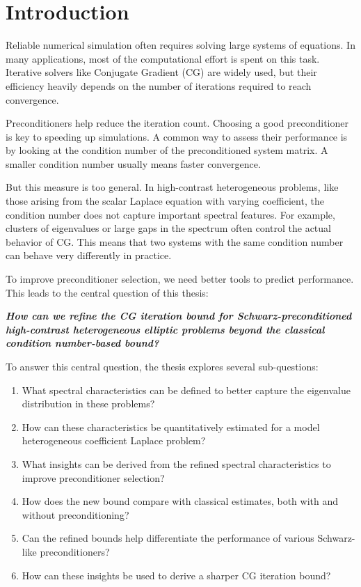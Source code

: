 \chapter{Introduction}\label{ch:introduction}
Reliable numerical simulation often requires solving large systems of equations. In many applications, most of the computational effort is spent on this task. Iterative solvers like Conjugate Gradient (CG) are widely used, but their efficiency heavily depends on the number of iterations required to reach convergence.

Preconditioners help reduce the iteration count. Choosing a good preconditioner is key to speeding up simulations. A common way to assess their performance is by looking at the condition number of the preconditioned system matrix. A smaller condition number usually means faster convergence.

But this measure is too general. In high-contrast heterogeneous problems, like those arising from the scalar Laplace equation with varying coefficient, the condition number does not capture important spectral features. For example, clusters of eigenvalues or large gaps in the spectrum often control the actual behavior of CG. This means that two systems with the same condition number can behave very differently in practice.

To improve preconditioner selection, we need better tools to predict performance. This leads to the central question of this thesis:

\vspace{0.5em}
\begin{center}
\textit{\textbf{How can we refine the CG iteration bound for Schwarz-preconditioned high-contrast heterogeneous elliptic problems beyond the classical condition number-based bound?}}
\end{center}
\vspace{0.5em}

To answer this central question, the thesis explores several sub-questions:
\begin{enumerate}
    \item What spectral characteristics can be defined to better capture the eigenvalue distribution in these problems?
    \item How can these characteristics be quantitatively estimated for a model heterogeneous coefficient Laplace problem?
    \item What insights can be derived from the refined spectral characteristics to improve preconditioner selection?
    \item How does the new bound compare with classical estimates, both with and without preconditioning?
    \item Can the refined bounds help differentiate the performance of various Schwarz-like preconditioners?
    \item How can these insights be used to derive a sharper CG iteration bound?
\end{enumerate}

